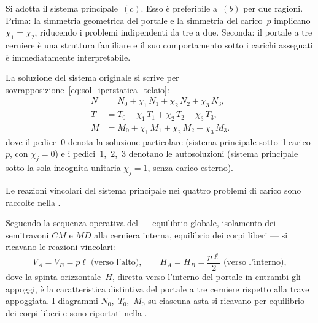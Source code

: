 \begin{esempio}
\begin{svolgimento}
		Si adotta il sistema principale~$(c)$.
		Esso è preferibile a~$(b)$ per due ragioni.
		Prima: la simmetria geometrica del portale e la simmetria
		del carico~$p$ implicano $\chi_1 = \chi_2$, riducendo
		i problemi indipendenti da tre a due.
		Seconda: il portale a tre cerniere è una struttura familiare
		e il suo comportamento sotto i carichi assegnati è
		immediatamente interpretabile.
		
		La soluzione del sistema originale si scrive per
		sovrapposizione~\eqref{eq:sol_iperstatica_telaio}:
		\begin{equation}\label{eq:portale_sovrapposizione}
			\begin{aligned}
				N &= N_0 + \chi_1\,N_1 + \chi_2\,N_2 + \chi_3\,N_3, \\
				T &= T_0 + \chi_1\,T_1 + \chi_2\,T_2 + \chi_3\,T_3, \\
				M &= M_0 + \chi_1\,M_1 + \chi_2\,M_2 + \chi_3\,M_3.
			\end{aligned}
		\end{equation}
		dove il pedice~$0$ denota la soluzione particolare
		(sistema principale sotto il carico~$p$, con
		$\chi_j = 0$) e i pedici~$1$,~$2$,~$3$ denotano le
		autosoluzioni (sistema principale sotto la sola
		incognita unitaria $\chi_j = 1$, senza carico esterno).
		
		



		
		Le reazioni vincolari del sistema principale nei quattro problemi
		di carico sono raccolte nella .
		
		
		Seguendo la sequenza operativa del
		 --- equilibrio
		globale, isolamento dei semitravoni $CM$ e $MD$
		alla cerniera interna, equilibrio dei corpi liberi
		--- si ricavano le reazioni vincolari:
		\[
		V_A = V_B = p\ell \;\text{(verso l'alto)},
		\qquad
		H_A = H_B = \frac{p\ell}{2} \;\text{(verso l'interno)},
		\]
		dove la spinta orizzontale~$H$, diretta verso
		l'interno del portale in entrambi gli appoggi,
		è la caratteristica distintiva del portale a tre
		cerniere rispetto alla trave appoggiata.
		I diagrammi $N_0$,~$T_0$,~$M_0$ su ciascuna asta
		si ricavano per equilibrio dei corpi liberi e sono
		riportati nella .
		


\end{svolgimento}
\end{esempio}
